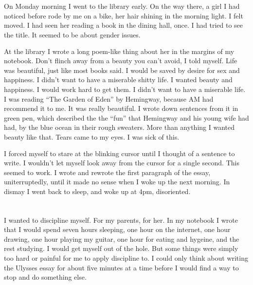 \section{}

On Monday morning I went to the library early.  On the way there, a girl I had
noticed before rode by me on a bike, her hair shining in the morning light.  I
felt moved.  I had seen her reading a book in the dining hall, once.  I had
tried to see the title.  It seemed to be about gender issues.

At the library I wrote a long poem-like thing about her in the margins of my
notebook.  Don't flinch away from a beauty you can't avoid, I told myself.  Life
was beautiful, just like most books said.  I would be saved by desire for sex and
happiness.  I didn't want to have a miserable shitty life.  I wanted beauty and
happiness.  I would work hard to get them.  I didn't want to have a miserable
life.  I was reading ``The Garden of Eden'' by Hemingway, because AM had recommend it to
me.  It was really beautiful.  I wrote down sentences from it in green pen,
which described the the ``fun'' that Hemingway and his young wife had had, by
the blue ocean in their rough sweaters.  More than anything I wanted beauty like
that.  Tears came to my eyes.  I was sick of this.

I forced myself to stare at the blinking cursor until I thought of a sentence to
write.  I wouldn't let myself look away from the cursor for a single second.
This seemed to work.  I wrote and rewrote the first paragraph of the essay,
uniterruptedly, until it made no sense when I woke up the next morning.  In
dismay I went back to sleep, and woke up at 4pm, disoriented.  

\section{}

I wanted to discipline myself.  For my parents, for her.  In my notebook I wrote
that I would spend seven hours sleeping, one hour on the internet, one hour
drawing, one hour playing my guitar, one hour for eating and hygeine, and the
rest studying.  I would get myself out of the hole.  But some things were simply
too hard or painful for me to apply discipline to.  I could only think about
writing the Ulysses essay for about five minutes at a time before I would find a
way to stop and do something else.

\section{}

